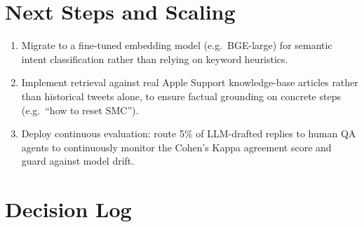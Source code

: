 \documentclass[11pt]{article}
\begin{document}
\section{Next Steps and Scaling}

\begin{enumerate}
  \item Migrate to a fine-tuned embedding model (e.g.\ BGE-large) for semantic intent classification rather than relying on keyword heuristics.
  \item Implement retrieval against real Apple Support knowledge-base articles rather than historical tweets alone, to ensure factual grounding on concrete steps (e.g.\ ``how to reset SMC'').
  \item Deploy continuous evaluation: route 5\% of LLM-drafted replies to human QA agents to continuously monitor the Cohen's Kappa agreement score and guard against model drift.
\end{enumerate}

\section{Decision Log}
\end{document}
